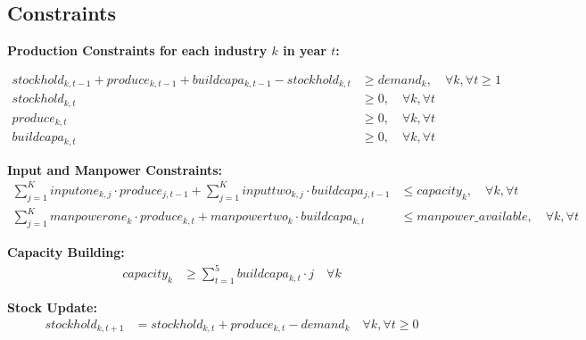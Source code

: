 \documentclass{article}
\begin{document}
\subsection*{Constraints}
\textbf{Production Constraints for each industry \( k \) in year \( t \):}

\[
\begin{aligned}
    stockhold_{k, t-1} + produce_{k, t-1} + buildcapa_{k, t-1} - stockhold_{k, t} & \geq demand_k, \quad \forall k, \forall t \geq 1 \\
    stockhold_{k, t} & \geq 0, \quad \forall k, \forall t \\
    produce_{k, t} & \geq 0, \quad \forall k, \forall t \\
    buildcapa_{k, t} & \geq 0, \quad \forall k, \forall t
\end{aligned}
\]

\textbf{Input and Manpower Constraints:}
\[
\begin{aligned}
    \sum_{j=1}^{K} inputone_{k, j} \cdot produce_{j, t-1} + \sum_{j=1}^{K} inputtwo_{k, j} \cdot buildcapa_{j, t-1} & \leq capacity_k, \quad \forall k, \forall t \\
    \sum_{j=1}^{K} manpowerone_{k} \cdot produce_{k, t} + manpowertwo_{k} \cdot buildcapa_{k, t} & \leq manpower\_available, \quad \forall k, \forall t
\end{aligned}
\]

\textbf{Capacity Building:}
\[
\begin{aligned}
    capacity_k & \geq \sum_{t=1}^{5} buildcapa_{k, t} \cdot j \quad \forall k
\end{aligned}
\]

\textbf{Stock Update:}
\[
\begin{aligned}
    stockhold_{k, t+1} & = stockhold_{k, t} + produce_{k, t} - demand_k \quad \forall k, \forall t \geq 0
\end{aligned}
\]
\end{document}
